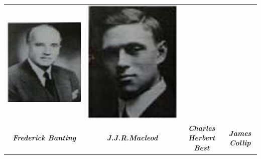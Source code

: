{{\begin{tabular}{@{}cccc@{}}
\includegraphics[scale=.6]{images/013.jpg} &
\includegraphics[scale=.5]{images/014.jpg}\\
{\small\textit{\textbf{Frederick Banting}}} &
{\small\textit{\textbf{J.J.R.Macleod}}} &
{\small\textit{\textbf{Charles Herbert Best}}} &
{\small\textit{\textbf{James Collip}}}
\end{tabular}
}}

